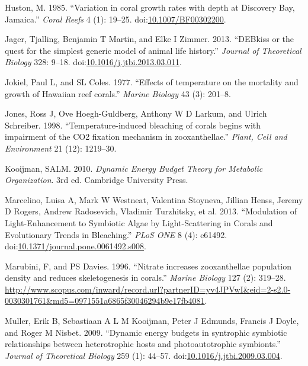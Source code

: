 \documentclass[]{elsarticle} %
\begin{document}
\hypertarget{ref-Huston:1985ec}{}
Huston, M. 1985. ``Variation in coral growth rates with depth at
Discovery Bay, Jamaica.'' \emph{Coral Reefs} 4 (1): 19--25.
doi:\href{https://doi.org/10.1007/BF00302200}{10.1007/BF00302200}.

\hypertarget{ref-Jager:2013bj}{}
Jager, Tjalling, Benjamin T Martin, and Elke I Zimmer. 2013. ``DEBkiss
or the quest for the simplest generic model of animal life history.''
\emph{Journal of Theoretical Biology} 328: 9--18.
doi:\href{https://doi.org/10.1016/j.jtbi.2013.03.011}{10.1016/j.jtbi.2013.03.011}.

\hypertarget{ref-Jokiel:1977p7353}{}
Jokiel, Paul L, and SL Coles. 1977. ``Effects of temperature on the
mortality and growth of Hawaiian reef corals.'' \emph{Marine Biology} 43
(3): 201--8.

\hypertarget{ref-Jones:1998p3572}{}
Jones, Ross J, Ove Hoegh-Guldberg, Anthony W D Larkum, and Ulrich
Schreiber. 1998. ``Temperature-induced bleaching of corals begins with
impairment of the CO2 fixation mechanism in zooxanthellae.''
\emph{Plant, Cell and Environment} 21 (12): 1219--30.

\hypertarget{ref-Kooijman:2010vd}{}
Kooijman, SALM. 2010. \emph{Dynamic Energy Budget Theory for Metabolic
Organization}. 3rd ed. Cambridge University Press.

\hypertarget{ref-Marcelino:2013hz}{}
Marcelino, Luisa A, Mark W Westneat, Valentina Stoyneva, Jillian Henss,
Jeremy D Rogers, Andrew Radosevich, Vladimir Turzhitsky, et al. 2013.
``Modulation of Light-Enhancement to Symbiotic Algae by Light-Scattering
in Corals and Evolutionary Trends in Bleaching.'' \emph{PLoS ONE} 8 (4):
e61492.
doi:\href{https://doi.org/10.1371/journal.pone.0061492.s008}{10.1371/journal.pone.0061492.s008}.

\hypertarget{ref-Marubini:1996p8460}{}
Marubini, F, and PS Davies. 1996. ``Nitrate increases zooxanthellae
population density and reduces skeletogenesis in corals.'' \emph{Marine
Biology} 127 (2): 319--28.
\url{http://www.scopus.com/inward/record.url?partnerID=yv4JPVwI\&eid=2-s2.0-0030301761\&md5=0971551a6865f30046294b9e17fb4081}.

\hypertarget{ref-Muller:2009io}{}
Muller, Erik B, Sebastiaan A L M Kooijman, Peter J Edmunds, Francis J
Doyle, and Roger M Nisbet. 2009. ``Dynamic energy budgets in syntrophic
symbiotic relationships between heterotrophic hosts and photoautotrophic
symbionts.'' \emph{Journal of Theoretical Biology} 259 (1): 44--57.
doi:\href{https://doi.org/10.1016/j.jtbi.2009.03.004}{10.1016/j.jtbi.2009.03.004}.
\end{document}
